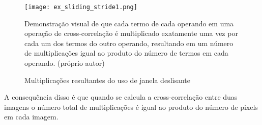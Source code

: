 \begin{figure}[!htb]
	\centering
	\texttt{[image: ex\_sliding\_stride1.png]}
	\caption{Multiplicações resultantes do uso de janela deslisante}
	\label{fig:ex_sliding_stride1}
	Demonstração visual de que cada termo de cada operando em uma operação de
	cross-correlação é multiplicado exatamente uma vez por cada um dos termos do
	outro operando, resultando em um número de multiplicações igual ao produto
	do número de termos em cada operando. (próprio autor)
\end{figure}

A consequência disso é que quando se calcula a cross-correlação entre duas
imagens o número total de multiplicações é igual ao produto do número de pixels
em cada imagem.
